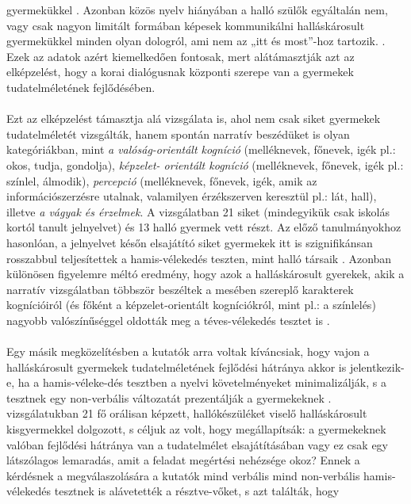 gyermekükkel \autocite{peterson_siegal_1999}. Azonban közös nyelv hiányában a halló szülők egyáltalán nem, vagy
csak nagyon limitált formában képesek kommunikálni halláskárosult gyermekükkel minden
olyan dologról, ami nem az „itt és most”-hoz tartozik. \autocite{peterson_siegal_1999}. Ezek az adatok azért
kiemelkedően fontosak, mert alátámasztják azt az elképzelést, hogy a korai dialógusnak
központi szerepe van a gyermekek tudatelméletének fejlődésében. \\
\\
Ezt az elképzelést támasztja alá \textcite{peterson_slaughter_2006} vizsgálata is, ahol nem csak siket gyermekek
tudatelméletét vizsgálták, hanem spontán narratív beszédüket is olyan kategóriákban, mint \textit{a
	valóság-orientált kogníció} (melléknevek, főnevek, igék pl.: okos, tudja, gondolja), \textit{képzelet-
	orientált kogníció } (melléknevek, főnevek, igék pl.: színlel, álmodik), \textit{percepció} (melléknevek,
főnevek, igék, amik az információszerzésre utalnak, valamilyen érzékszerven keresztül pl.:
lát, hall), illetve \textit{a vágyak és érzelmek}. A vizsgálatban 21 siket (mindegyikük csak iskolás kortól
tanult jelnyelvet) és 13 halló gyermek vett részt. Az előző tanulmányokhoz hasonlóan, a
jelnyelvet későn elsajátító siket gyermekek itt is szignifikánsan rosszabbul teljesítettek a
hamis-vélekedés teszten, mint halló társaik \autocite{peterson_slaughter_2006}. Azonban különösen figyelemre méltó
eredmény, hogy azok a halláskárosult gyerekek, akik a narratív vizsgálatban többször
beszéltek a mesében szereplő karakterek kognícióiról (és főként a képzelet-orientált
kogní\-ciókról, mint pl.: a színlelés) nagyobb valószínűséggel oldották meg a téves-vélekedés
tesztet is \autocite{peterson_slaughter_2006}.\\
\\
Egy másik megközelítésben a kutatók arra voltak kíváncsiak, hogy vajon a halláskárosult
gyermekek tudatelméletének fejlődési hátránya akkor is jelentkezik-e, ha a hamis-véleke-dés
tesztben a nyelvi követelményeket minimalizálják, s a tesztnek egy non-verbális válto\-zatát
prezentálják a gyermekeknek \autocite{figueras-costa_harris_2001}. \textcite{figueras-costa_harris_2001}
vizsgálatukban 21 fő orálisan képzett, hallókészüléket viselő halláskárosult kisgyermekkel
dolgozott, s céljuk az volt, hogy megállapítsák: a gyermekeknek valóban fejlődési hátránya
van a tudatelmélet elsajátításában vagy ez csak egy látszólagos lemaradás, amit a feladat
megértési nehézsége okoz? Ennek a kérdésnek a megválaszolására a kutatók mind verbális
mind non-verbális hamis-vélekedés tesztnek is alávetették a résztve-vőket, s azt találták, hogy
